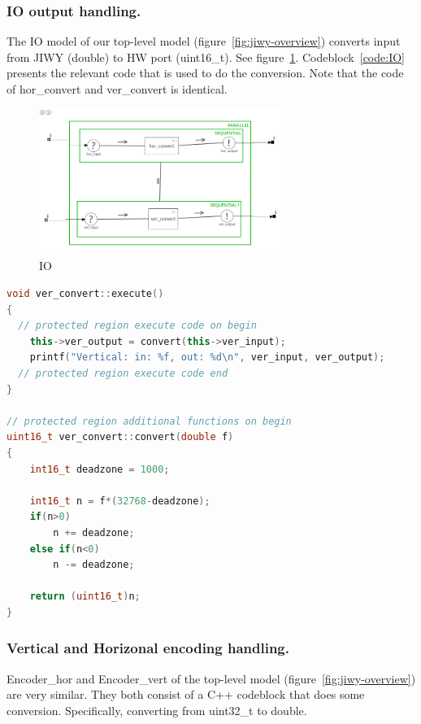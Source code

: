 \documentclass[a4paper,twoside,11pt]{article}
\begin{document}
\subsubsection{IO output handling.}
The IO model of our top-level model (figure~\ref{fig:jiwy-overview}) converts input from JIWY (double) to HW port (uint16\_t). See figure~\ref{fig:jiwy-IO}.
Codeblock~\ref{code:IO} presents the relevant code that is used to do the conversion.
Note that the code of hor\_convert and ver\_convert is identical.
\begin{figure}[h]
	\centering
	\includegraphics[width=0.7\textwidth]{./img/jiwy-IO.png}
	\caption{IO}
	\label{fig:jiwy-IO}
\end{figure}
\begin{lstlisting}[caption=Relevant code of the IO block, label=code:IO, language=C++]
void ver_convert::execute()
{
  // protected region execute code on begin
	this->ver_output = convert(this->ver_input);
	printf("Vertical: in: %f, out: %d\n", ver_input, ver_output);
  // protected region execute code end
}

// protected region additional functions on begin
uint16_t ver_convert::convert(double f)
{
	int16_t deadzone = 1000;

	int16_t n = f*(32768-deadzone);
	if(n>0)
		n += deadzone;
	else if(n<0)
		n -= deadzone;

	return (uint16_t)n;
}
\end{lstlisting}

\subsubsection{Vertical and Horizonal encoding handling.}
Encoder\_hor and Encoder\_vert of the top-level model (figure~\ref{fig:jiwy-overview}) are very similar.
They both consist of a C++ codeblock that does some conversion. 
Specifically, converting from uint32\_t to double. 
\end{document}
